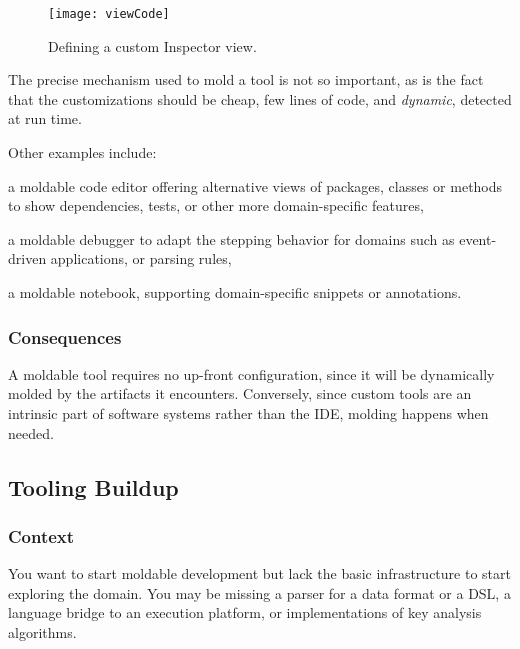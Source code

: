 \documentclass[sigconf]{acmart}
\begin{document}
\begin{figure}[h]
  \texttt{[image: viewCode]}
  \caption{Defining a custom Inspector view.}
  \label{fig:viewCode}
\end{figure}

The precise mechanism used to mold a tool is not so important, as is the fact that the customizations should be cheap, \ie few lines of code, and \emph{dynamic}, \ie detected at run time.

Other examples include:
\begin{inparaenum}[(i)]
\item a moldable code editor offering alternative views of packages, classes or methods to show dependencies, tests, or other more domain-specific features,
\item a moldable debugger to adapt the stepping behavior for domains such as event-driven applications, or parsing rules,
\item a moldable notebook, supporting domain-specific snippets or annotations.
\end{inparaenum}

\subsubsection*{Consequences}
A moldable tool requires no up-front configuration, since it will be dynamically molded by the artifacts it encounters.
Conversely, since custom tools are an intrinsic part of software systems rather than the IDE, molding happens when needed.

\subsection*{Tooling Buildup}\label{pat:toolingBuildup}
\subsubsection*{Context}
You want to start moldable development but lack the basic infrastructure to start exploring the domain.
You may be missing a parser for a data format or a DSL, a language bridge to an execution platform, or implementations of key analysis algorithms. 
\end{document}
